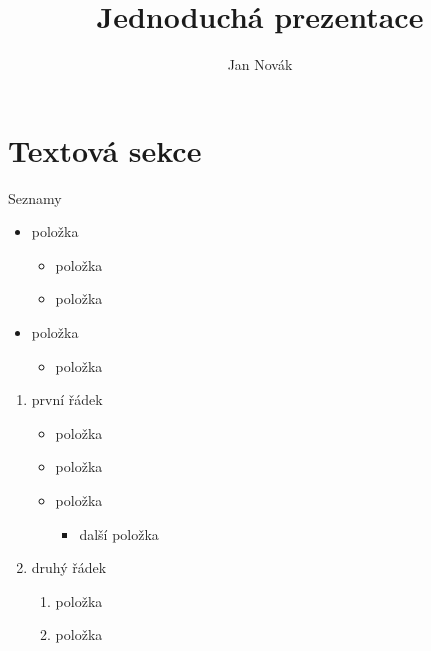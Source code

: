 \documentclass{beamer}							%
\author{Jan Novák}
\title{Jednoduchá prezentace}
\begin{document}
\maketitle



\section{Textová sekce}
\begin{frame}[fragile, shrink=0]{Seznamy}

	\begin{itemize}
		\item položka
		      \begin{itemize}
			      \item položka
			      \item položka
		      \end{itemize}
		\item položka
		      \begin{itemize}
			      \item položka
		      \end{itemize}
	\end{itemize}
	
		\begin{enumerate}
			\item první řádek
			\begin{itemize}
			      \item položka
			      \item položka
			      \item položka
			      \begin{itemize}
					\item další položka
				
				\end{itemize}
		      \end{itemize}
			\item druhý řádek
			  \begin{enumerate}
			      \item položka
			      \item položka
		      \end{enumerate}
		\end{enumerate}
	
\end{frame}
\end{document}
